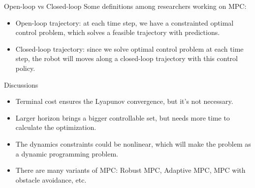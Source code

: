 \documentclass{beamer}
\begin{document}
\begin{frame}{Open-loop vs Closed-loop }
	Some definitions among researchers working on MPC:
	\begin{itemize}
		\item Open-loop trajectory: at each time step, we have a constrainted optimal control problem, which solves a feasible trajectory with predictions.
		\item Closed-loop trajectory: since we solve optimal control problem at each time step, the robot will moves along a closed-loop trajectory with this control policy.
	\end{itemize}
\end{frame}

\begin{frame}{Discussions}
	\begin{itemize}
		\item Terminal cost ensures the Lyapunov convergence, but it's not necessary.
		\item Larger horizon brings a bigger controllable set, but needs more time to calculate the optimization.
		\item The dynamics constraints could be nonlinear, which will make the problem as a dynamic programming problem.
		\item There are many variants of MPC: Robust MPC, Adaptive MPC, MPC with obstacle avoidance, etc.
	\end{itemize}
\end{frame}




\end{document}

